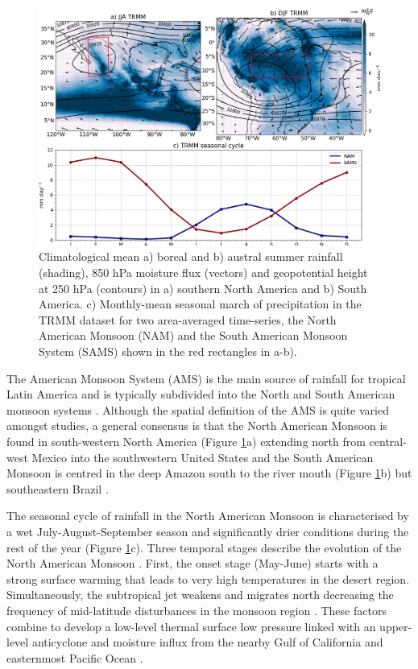 \begin{figure}[t!]
\includegraphics[width=\linewidth]{figures/amsclim.png}
\caption[The American monsoon system climatology]{ Climatological mean a) boreal and b) austral summer rainfall (shading), 850 hPa moisture flux (vectors) and geopotential height at 250 hPa (contours) in a) southern North America and b) South America. c) Monthly-mean seasonal march of precipitation in the TRMM dataset for two area-averaged time-series, the North American Monsoon (NAM) and the South American Monsoon System (SAMS) shown in the red rectangles in a-b). }
\label{fig:americanmonsoon}
\end{figure}

The American Monsoon System (AMS) is the main source of rainfall for tropical Latin America and is typically subdivided into the North and South American monsoon systems \citep{vera2006}. 
Although the spatial definition of the AMS is quite varied amongst studies, a general consensus is that the North American Monsoon is found in south-western North America (Figure \ref{fig:americanmonsoon}a) extending north from central-west Mexico into the southwestern United States and the South American Monsoon is centred in the deep Amazon south to the river mouth (Figure \ref{fig:americanmonsoon}b) but southeastern Brazil  \citep{adams1997,stensrud1997,vera2006}.


 The seasonal cycle of rainfall in the North American Monsoon is characterised by a wet July-August-September season and significantly drier conditions during the rest of the year \citep{adams1997} (Figure \ref{fig:americanmonsoon}c).
Three temporal stages describe the evolution of the North American Monsoon \citep{adams1997,geil2013}.
First, the onset stage (May-June) starts with a strong surface warming that leads to very high temperatures in the desert region.
Simultaneously, the subtropical jet weakens and migrates north decreasing the frequency of mid-latitude disturbances in the monsoon region \citep{douglas1993,turrent2009}.
These factors combine to develop a low-level thermal surface low pressure linked with an upper-level anticyclone and  moisture influx from the nearby Gulf of California and easternmost Pacific Ocean \citep{douglas1993,geil2013}.

